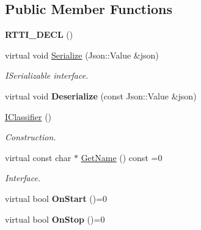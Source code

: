 \subsection*{Public Member Functions}
\begin{DoxyCompactItemize}
\item 
\mbox{\label{class_i_classifier_a95d67344da5f1e0fa1da3d701d4bfd3f}} 
{\bfseries R\+T\+T\+I\+\_\+\+D\+E\+CL} ()
\item 
\mbox{\label{class_i_classifier_a346562110d1f71b7543b7e3e4b861118}} 
virtual void \hyperlink{class_i_classifier_a346562110d1f71b7543b7e3e4b861118}{Serialize} (Json\+::\+Value \&json)
\begin{DoxyCompactList}\small\item\em I\+Serializable interface. \end{DoxyCompactList}\item 
\mbox{\label{class_i_classifier_ada0c3d856f88fdc6561bad90005f7fe7}} 
virtual void {\bfseries Deserialize} (const Json\+::\+Value \&json)
\item 
\mbox{\label{class_i_classifier_a856b76897089d0bc0fa113c7fe84c9ef}} 
\hyperlink{class_i_classifier_a856b76897089d0bc0fa113c7fe84c9ef}{I\+Classifier} ()
\begin{DoxyCompactList}\small\item\em Construction. \end{DoxyCompactList}\item 
\mbox{\label{class_i_classifier_ac27b83132de5d650fdfcfe62a61d73c8}} 
virtual const char $\ast$ \hyperlink{class_i_classifier_ac27b83132de5d650fdfcfe62a61d73c8}{Get\+Name} () const =0
\begin{DoxyCompactList}\small\item\em Interface. \end{DoxyCompactList}\item 
\mbox{\label{class_i_classifier_ab43bd079a6c539bcbeef7d47cc89d2d2}} 
virtual bool {\bfseries On\+Start} ()=0
\item 
\mbox{\label{class_i_classifier_ad13b23a90aecd95f3bf0fc918e583e62}} 
virtual bool {\bfseries On\+Stop} ()=0
\end{DoxyCompactItemize}


